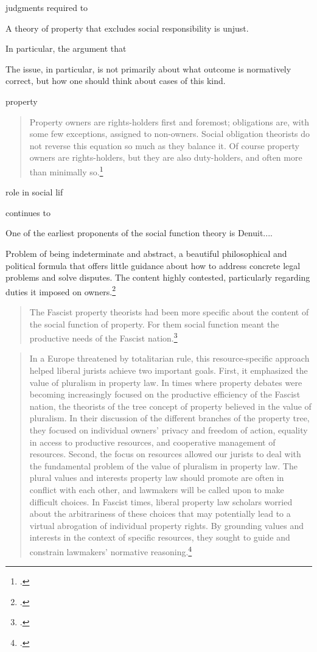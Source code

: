  judgments required to 

A theory of property that excludes
social responsibility
is unjust.





In particular, the argument that 


The issue, in particular, is not primarily about what outcome is normatively correct, but how one should think about cases of this kind. 

property

\begin{quote}Property owners are rights-holders first and foremost; obligations are, with some few exceptions, assigned to non-owners. Social obligation theorists do not reverse this equation so much as they balance it. Of course property owners are rights-holders, but they are also
duty-holders,
and often more than minimally so.\footcite[1023]{alexander11}
\end{quote}

role in social lif


 continues to 

One of the earliest proponents of the social function theory is Denuit.... 

Problem of being indeterminate and abstract, a beautiful philosophical and political formula that offers little guidance about how to address concrete legal problems and solve disputes. The content highly contested, particularly regarding duties it imposed on owners.\footcite[908]{robilant13}

\begin{quote}
The Fascist property theorists had been more specific about the content of the social function of property. For them social function meant the productive needs of the Fascist nation.\footcite[909]{robilant13}
\end{quote}

\begin{quote}
In a Europe threatened by totalitarian
rule, this resource-specific approach helped liberal jurists achieve two
important goals. First, it emphasized the value of pluralism in property law. In
times where property debates were becoming increasingly
focused on the productive efficiency of the Fascist nation, the
theorists of the tree concept of property believed in the
value of pluralism. In their discussion of the different branches of the property tree,
they focused on individual owners' privacy and freedom of action, equality in access to productive resources, and cooperative management of resources. Second, the focus on resources allowed our jurists to deal with
the fundamental problem of the value of pluralism in property law. The plural values and interests property law should promote are often in conflict with each other, and lawmakers will be called upon to make
difficult choices. In Fascist times, liberal property law scholars worried about the arbitrariness of these choices that may potentially
lead to a virtual abrogation of individual property rights. By grounding values and interests in the context of specific resources, they sought to guide and constrain lawmakers' normative reasoning.\footcite[910-911]{robilant13}
\end{quote}

